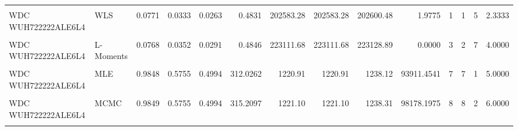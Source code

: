 \documentclass[
]{article}
\begin{document}
\begin{longtable}[t]{llrrrrrrrrrrrr}
\cellcolor{gray!10}{WDC WUH722222ALE6L4} & \cellcolor{gray!10}{OLS} & \cellcolor{gray!10}{0.0812} & \cellcolor{gray!10}{0.0339} & \cellcolor{gray!10}{0.0260} & \cellcolor{gray!10}{0.5157} & \cellcolor{gray!10}{195793.10} & \cellcolor{gray!10}{195793.10} & \cellcolor{gray!10}{195810.31} & \cellcolor{gray!10}{2.9896} & \cellcolor{gray!10}{2} & \cellcolor{gray!10}{3} & \cellcolor{gray!10}{4} & \cellcolor{gray!10}{3.0000}\\
WDC WUH722222ALE6L4 & WLS & 0.0771 & 0.0333 & 0.0263 & 0.4831 & 202583.28 & 202583.28 & 202600.48 & 1.9775 & 1 & 1 & 5 & 2.3333\\
\addlinespace
\cellcolor{gray!10}{WDC WUH722222ALE6L4} & \cellcolor{gray!10}{MOM} & \cellcolor{gray!10}{0.0867} & \cellcolor{gray!10}{0.0375} & \cellcolor{gray!10}{0.0307} & \cellcolor{gray!10}{0.5275} & \cellcolor{gray!10}{230700.18} & \cellcolor{gray!10}{230700.18} & \cellcolor{gray!10}{230717.39} & \cellcolor{gray!10}{0.0000} & \cellcolor{gray!10}{4} & \cellcolor{gray!10}{4} & \cellcolor{gray!10}{8} & \cellcolor{gray!10}{5.3333}\\
WDC WUH722222ALE6L4 & L-Moments & 0.0768 & 0.0352 & 0.0291 & 0.4846 & 223111.68 & 223111.68 & 223128.89 & 0.0000 & 3 & 2 & 7 & 4.0000\\
\cellcolor{gray!10}{WDC WUH722222ALE6L4} & \cellcolor{gray!10}{EPF} & \cellcolor{gray!10}{0.0976} & \cellcolor{gray!10}{0.0412} & \cellcolor{gray!10}{0.0336} & \cellcolor{gray!10}{0.6171} & \cellcolor{gray!10}{239868.14} & \cellcolor{gray!10}{239868.14} & \cellcolor{gray!10}{239885.34} & \cellcolor{gray!10}{0.0000} & \cellcolor{gray!10}{5} & \cellcolor{gray!10}{5} & \cellcolor{gray!10}{9} & \cellcolor{gray!10}{6.3333}\\
WDC WUH722222ALE6L4 & MLE & 0.9848 & 0.5755 & 0.4994 & 312.0262 & 1220.91 & 1220.91 & 1238.12 & 93911.4541 & 7 & 7 & 1 & 5.0000\\
\cellcolor{gray!10}{WDC WUH722222ALE6L4} & \cellcolor{gray!10}{MAP} & \cellcolor{gray!10}{0.9845} & \cellcolor{gray!10}{0.5756} & \cellcolor{gray!10}{0.4996} & \cellcolor{gray!10}{340.4928} & \cellcolor{gray!10}{1271.91} & \cellcolor{gray!10}{1271.91} & \cellcolor{gray!10}{1289.12} & \cellcolor{gray!10}{2276.5954} & \cellcolor{gray!10}{9} & \cellcolor{gray!10}{9} & \cellcolor{gray!10}{3} & \cellcolor{gray!10}{7.0000}\\
\addlinespace
WDC WUH722222ALE6L4 & MCMC & 0.9849 & 0.5755 & 0.4994 & 315.2097 & 1221.10 & 1221.10 & 1238.31 & 98178.1975 & 8 & 8 & 2 & 6.0000\\
\cellcolor{gray!10}{WDC WUH722222ALE6L4} & \cellcolor{gray!10}{Percentile} & \cellcolor{gray!10}{0.1392} & \cellcolor{gray!10}{0.0605} & \cellcolor{gray!10}{0.0458} & \cellcolor{gray!10}{1.0983} & \cellcolor{gray!10}{220752.17} & \cellcolor{gray!10}{220752.17} & \cellcolor{gray!10}{220769.37} & \cellcolor{gray!10}{7.2683} & \cellcolor{gray!10}{6} & \cellcolor{gray!10}{6} & \cellcolor{gray!10}{6} & \cellcolor{gray!10}{6.0000}\\*
\end{longtable}
\endgroup{}
\end{document}
